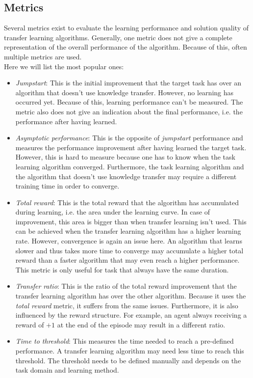 \documentclass[a4paper]{article}
\begin{document}
\subsection{Metrics}
Several metrics exist to evaluate the learning performance and solution quality of transfer learning algorithms. Generally, one metric does not give a complete representation of the overall performance of the algorithm. Because of this, often multiple metrics are used.\\
Here we will list the most popular ones:
\begin{itemize}
    \item \textit{Jumpstart}: This is the initial improvement that the target task has over an algorithm that doesn't use knowledge transfer. However, no learning has occurred yet. Because of this, learning performance can't be measured. The metric also does not give an indication about the final performance, i.e. the performance after having learned.
    \item \textit{Asymptotic performance}: This is the opposite of \textit{jumpstart} performance and measures the performance improvement after having learned the target task. However, this is hard to measure because one has to know when the task learning algorithm converged. Furthermore, the task learning algorithm and the algorithm that doesn't use knowledge transfer may require a different training time in order to converge.
    \item \textit{Total reward}: This is the total reward that the algorithm has accumulated during learning, i.e. the area under the learning curve. In case of improvement, this area is bigger than when transfer learning isn't used. This can be achieved when the transfer learning algorithm has a higher learning rate. However, convergence is again an issue here. An algorithm that learns slower and thus takes more time to converge may accumulate a higher total reward than a faster algorithm that may even reach a higher performance. This metric is only useful for task that always have the same duration.
    \item \textit{Transfer ratio}: This is the ratio of the total reward improvement that the transfer learning algorithm has over the other algorithm. Because it uses the \textit{total reward} metric, it suffers from the same issues. Furthermore, it is also influenced by the reward structure. For example, an agent always receiving a reward of $+1$ at the end of the episode may result in a different ratio.
    \item \textit{Time to threshold}: This measures the time needed to reach a pre-defined performance. A transfer learning algorithm may need less time to reach this threshold. The threshold needs to be defined manually and depends on the task domain and learning method.
\end{itemize}
\end{document}
